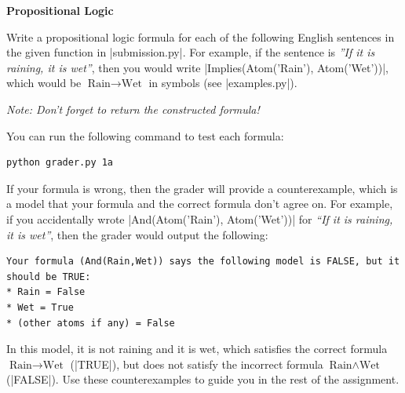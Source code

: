 \item {\bf Propositional Logic}

Write a propositional logic formula for each of the following English sentences
in the given function in |submission.py|. For example, if the sentence is
{\em ''If it is raining, it is wet''}, then you would write
|Implies(Atom('Rain'), Atom('Wet'))|, which would be $\text{Rain} \to
\text{Wet}$ in symbols (see |examples.py|).

{\em Note: Don't forget to return the constructed formula!}

\begin{enumerate}

  

  

  

\end{enumerate}

You can run the following command to test each formula:
\begin{lstlisting}
python grader.py 1a
\end{lstlisting}

If your formula is wrong, then the grader will provide a counterexample, which
is a model that your formula and the correct formula don't agree on. For
example, if you accidentally wrote |And(Atom('Rain'), Atom('Wet'))| for
{\em ``If it is raining, it is wet''}, then the grader would output the
following:
\begin{lstlisting}
Your formula (And(Rain,Wet)) says the following model is FALSE, but it should be TRUE:
* Rain = False
* Wet = True
* (other atoms if any) = False
\end{lstlisting}

In this model, it is not raining and it is wet, which satisfies the correct
formula $\text{Rain} \to \text{Wet}$ (|TRUE|), but does not satisfy the
incorrect formula $\text{Rain} \wedge \text{Wet}$ (|FALSE|). Use these
counterexamples to guide you in the rest of the assignment.
